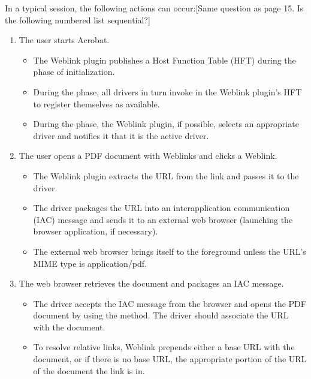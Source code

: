 \documentclass[letterpaper,12pt,english,openany,oneside]{sphinxmanual}
\begin{document}
In a typical session, the following actions can occur:{[}Same question as page 15. Is the following numbered list sequential?{]}
\begin{enumerate}
%
\item {} 
The user starts Acrobat.
\begin{itemize}
\item {} 
The Weblink plugin publishes a Host Function Table (HFT) during the  phase of initialization.

\item {} 
During the  phase, all drivers in turn invoke  in the Weblink plugin’s HFT to register themselves as available.

\item {} 
During the  phase, the Weblink plugin, if possible, selects an appropriate driver and notifies it that it is the active driver.

\end{itemize}

\item {} 
The user opens a PDF document with Weblinks and clicks a Weblink.
\begin{itemize}
\item {} 
The Weblink plugin extracts the URL from the link and passes it to the driver.

\item {} 
The driver packages the URL into an interapplication communication (IAC) message and sends it to an external web browser (launching the browser application, if necessary).

\item {} 
The external web browser brings itself to the foreground unless the URL’s MIME type is application/pdf.

\end{itemize}

\item {} 
The web browser retrieves the document and packages an IAC message.
\begin{itemize}
\item {} 
The driver accepts the IAC message from the browser and opens the PDF document by using the  method. The driver should associate the URL with the document.

\item {} 
To resolve relative links, Weblink prepends either a base URL with the document, or if there is no base URL, the appropriate portion of the URL of the document the link is in.

\end{itemize}

\end{enumerate}
\end{document}
